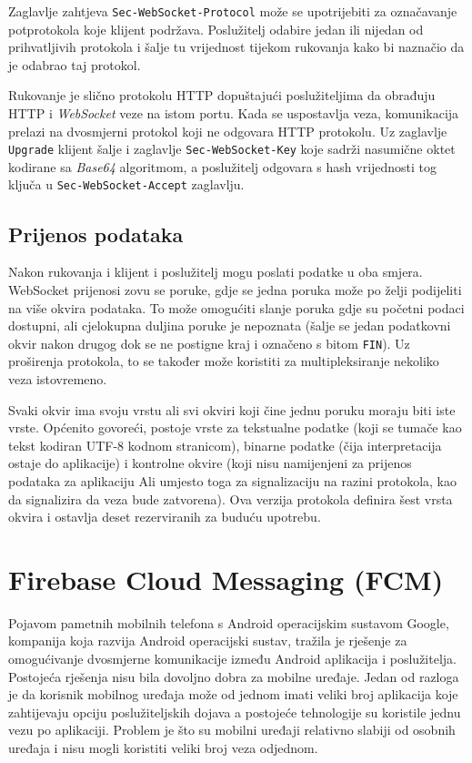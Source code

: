 \documentclass[times, utf8, zavrsni]{fer}
\begin{document}
{Zaglavlje zahtjeva {\tt Sec-WebSocket-Protocol} može se upotrijebiti za označavanje potprotokola koje klijent podržava. Poslužitelj odabire jedan ili nijedan od prihvatljivih protokola i šalje tu vrijednost tijekom rukovanja kako bi naznačio da je odabrao taj protokol.

Rukovanje je slično protokolu HTTP dopuštajući poslužiteljima da obrađuju HTTP i {\em WebSocket} veze na istom portu. Kada se uspostavlja veza, komunikacija prelazi na dvosmjerni protokol koji ne odgovara HTTP protokolu. Uz zaglavlje {\tt Upgrade} klijent šalje i zaglavlje {\tt Sec-WebSocket-Key} koje sadrži nasumične oktet kodirane sa {\em Base64} algoritmom, a poslužitelj odgovara s hash vrijednosti tog ključa u {\tt Sec-WebSocket-Accept} zaglavlju.

\subsection{Prijenos podataka}
Nakon rukovanja i klijent i poslužitelj mogu poslati podatke u oba smjera. WebSocket prijenosi zovu se poruke, gdje se jedna poruka može po želji podijeliti na više okvira podataka. To može omogućiti slanje poruka gdje su početni podaci dostupni, ali cjelokupna duljina poruke je nepoznata (šalje se jedan podatkovni okvir nakon drugog dok se ne postigne kraj i označeno s bitom {\tt FIN}). Uz proširenja protokola, to se također može koristiti za multipleksiranje nekoliko veza istovremeno. 

Svaki okvir ima svoju vrstu ali svi okviri koji čine jednu poruku moraju biti iste vrste. Općenito govoreći, postoje vrste za tekstualne podatke (koji se tumače kao tekst kodiran UTF-8 kodnom stranicom), binarne podatke (čija interpretacija ostaje do aplikacije) i kontrolne okvire (koji nisu namijenjeni za prijenos podataka za aplikaciju Ali umjesto toga za signalizaciju na razini protokola, kao da signalizira da veza bude zatvorena). Ova verzija protokola definira šest vrsta okvira i ostavlja deset rezerviranih za buduću upotrebu.

\section{Firebase Cloud Messaging (FCM)}

Pojavom pametnih mobilnih telefona s Android operacijskim sustavom Google, kompanija koja razvija Android operacijski sustav, tražila je rješenje za omogućivanje dvosmjerne komunikacije između Android aplikacija i poslužitelja. Postojeća rješenja nisu bila dovoljno dobra za mobilne uređaje. Jedan od razloga je da korisnik mobilnog uređaja može od jednom imati veliki broj aplikacija koje zahtijevaju opciju poslužiteljskih dojava a postojeće tehnologije su koristile jednu vezu po aplikaciji. Problem je što su mobilni uređaji relativno slabiji od osobnih uređaja i nisu mogli koristiti veliki broj veza odjednom.

}
\end{document}
